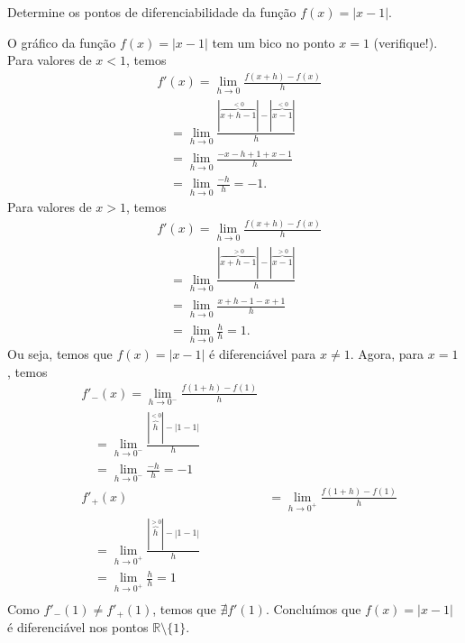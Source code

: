\begin{exeresol}
  Determine os pontos de diferenciabilidade da função $f(x) = |x-1|$.
\end{exeresol}
\begin{resol}
  O gráfico da função $f(x) = |x-1|$ tem um bico no ponto $x=1$ (verifique!). Para valores de $x<1$, temos
  \begin{align}
    & f'(x) = \lim_{h\to 0} \frac{f(x+h) - f(x)}{h}\\
    & \text{}\quad = \lim_{h\to 0} \frac{|\overbrace{x+h-1}^{<0}| - |\overbrace{x-1}^{<0}|}{h}\\
    & \text{}\quad = \lim_{h\to 0} \frac{-x-h+1+x-1}{h}\\
    & \text{}\quad = \lim_{h\to 0} \frac{-h}{h} = -1.
  \end{align}
  Para valores de $x > 1$, temos
  \begin{align}
    & f'(x) = \lim_{h\to 0} \frac{f(x+h) - f(x)}{h}\\
    & \text{}\quad = \lim_{h\to 0} \frac{|\overbrace{x+h-1}^{>0}| - |\overbrace{x-1}^{>0}|}{h}\\
    & \text{}\quad = \lim_{h\to 0} \frac{x+h-1-x+1}{h}\\
    & \text{}\quad = \lim_{h\to 0} \frac{h}{h} = 1.
  \end{align}
  Ou seja, temos que $f(x) = |x-1|$ é diferenciável para $x\neq 1$. Agora, para $x=1$, temos
  \begin{align}
    & f'_{-}(x) = \lim_{h\to 0^{-}} \frac{f(1+h) - f(1)}{h}\\
    & \text{}\quad = \lim_{h\to 0^{-}} \frac{|\overbrace{h}^{<0}| - |1-1|}{h}\\
    & \text{}\quad = \lim_{h\to 0^{-}} \frac{-h}{h} = -1\\
    & f'_{+}(x) &= \lim_{h\to 0^{+}} \frac{f(1+h) - f(1)}{h}\\
    & \text{}\quad = \lim_{h\to 0^{+}} \frac{|\overbrace{h}^{>0}| - |1-1|}{h}\\
    & \text{}\quad = \lim_{h\to 0^{+}} \frac{h}{h} = 1\\
  \end{align}
  Como $f'_{-}(1)\neq f'_{+}(1)$, temos que $\nexists f'(1)$. Concluímos que $f(x) = |x-1|$ é diferenciável nos pontos $\mathbb{R}\setminus\{1\}$. 
\end{resol}

